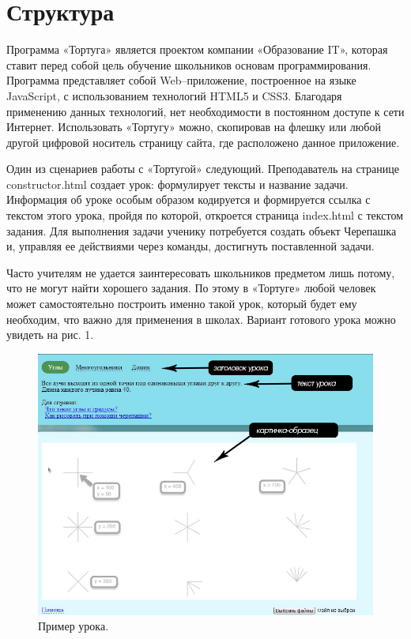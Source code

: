 \renewcommand{\chaptername}{Глава}
\chapter{Структура} \label{chapt1}


Программа «Тортуга» является проектом компании «Образование IT», которая ставит перед собой цель обучение школьников основам программирования. Программа представляет собой Web–приложение, построенное на языке JavaScript, с использованием технологий HTML5 и CSS3. Благодаря применению данных технологий, нет необходимости в постоянном доступе к сети Интернет. Использовать «Тортугу» можно, скопировав на флешку или любой другой цифровой носитель страницу сайта, где расположено данное приложение.\par
Один из сценариев работы с «Тортугой» следующий. Преподаватель на странице constructor.html создает урок: формулирует тексты и название задачи. Информация об уроке особым образом кодируется и формируется ссылка с текстом этого урока, пройдя по которой, откроется страница index.html с текстом задания. Для выполнения задачи ученику потребуется создать объект Черепашка и, управляя ее действиями через команды, достигнуть поставленной задачи.\par
Часто учителям не удается заинтересовать школьников предметом лишь потому, что не могут найти хорошего задания. По этому в «Тортуге» любой человек может самостоятельно построить именно такой урок, который будет ему необходим, что важно для применения в школах. Вариант готового урока можно увидеть на рис. 1. 
\vspace{50mm}

\begin{figure} [h] 
  \center
  \includegraphics [scale=0.70,natwidth=826,natheight=645] {images/pic1.jpg}
  \caption{Пример урока.} 
  \label{img:pic1}  
\end{figure}


